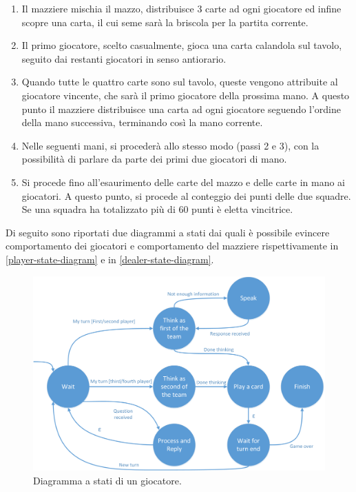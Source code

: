 \documentclass[a4paper,12pt]{article}
\begin{document}
\begin{enumerate}
	\item Il mazziere mischia il mazzo, distribuisce 3 carte ad ogni giocatore ed infine scopre una carta, il cui seme sarà la briscola per la partita corrente.
	\item Il primo giocatore, scelto casualmente, gioca una carta calandola sul tavolo, seguito dai restanti giocatori in senso antiorario.
	\item Quando tutte le quattro carte sono sul tavolo, queste vengono attribuite al giocatore vincente, che sarà il primo giocatore della prossima mano. A questo punto il mazziere distribuisce una carta ad ogni giocatore seguendo l'ordine della mano successiva, terminando così la mano corrente.
	\item Nelle seguenti mani, si procederà allo stesso modo (passi 2 e 3), con la possibilità di parlare da parte dei primi due giocatori di mano.
	\item Si procede fino all'esaurimento delle carte del mazzo e delle carte in mano ai giocatori. A questo punto, si procede al conteggio dei punti delle due squadre. Se una squadra ha totalizzato più di 60 punti è eletta vincitrice.
\end{enumerate}

Di seguito sono riportati due diagrammi a stati dai quali è possibile evincere comportamento dei giocatori e comportamento del mazziere rispettivamente in \autoref{player-state-diagram} e in \autoref{dealer-state-diagram}.

\begin{figure}[H]
	\centering
	\includegraphics[width=140mm]{./img/player_state_diagram.png}
	\caption{Diagramma a stati di un giocatore.  \label{player-state-diagram}}
\end{figure}
\end{document}
